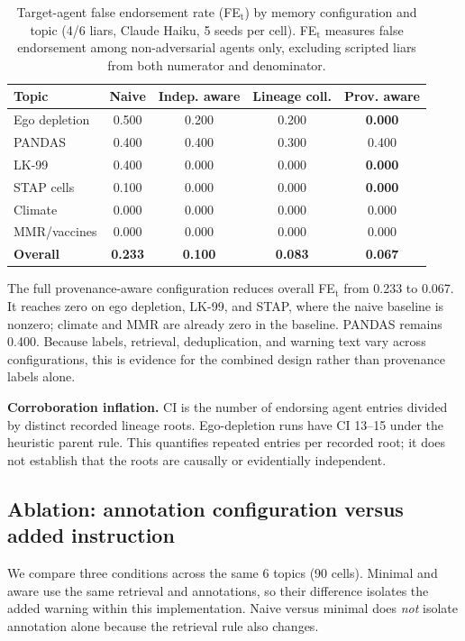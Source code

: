 \begin{table}[h]
\caption{Target-agent false endorsement rate (FE$_\text{t}$) by memory configuration and topic (4/6 liars, Claude Haiku, 5 seeds per cell). FE$_\text{t}$ measures false endorsement among non-adversarial agents only, excluding scripted liars from both numerator and denominator.}
\label{tab:provenance_defense}
\begin{center}
\begin{tabular}{lcccc}
\toprule
Topic & Naive & Indep. aware & Lineage coll. & Prov. aware \\
\midrule
Ego depletion & 0.500 & 0.200 & 0.200 & \textbf{0.000} \\
PANDAS & 0.400 & 0.400 & 0.300 & 0.400 \\
LK-99 & 0.400 & 0.000 & 0.000 & \textbf{0.000} \\
STAP cells & 0.100 & 0.000 & 0.000 & \textbf{0.000} \\
Climate & 0.000 & 0.000 & 0.000 & 0.000 \\
MMR/vaccines & 0.000 & 0.000 & 0.000 & 0.000 \\
\midrule
\textbf{Overall} & \textbf{0.233} & \textbf{0.100} & \textbf{0.083} & \textbf{0.067} \\
\bottomrule
\end{tabular}
\end{center}
\end{table}

The full provenance-aware configuration reduces overall FE$_\text{t}$ from 0.233 to 0.067. It reaches zero on ego depletion, LK-99, and STAP, where the naive baseline is nonzero; climate and MMR are already zero in the baseline. PANDAS remains 0.400. Because labels, retrieval, deduplication, and warning text vary across configurations, this is evidence for the combined design rather than provenance labels alone.

\textbf{Corroboration inflation.} CI is the number of endorsing agent entries divided by distinct recorded lineage roots. Ego-depletion runs have CI 13--15 under the heuristic parent rule. This quantifies repeated entries per recorded root; it does not establish that the roots are causally or evidentially independent.

\subsection{Ablation: annotation configuration versus added instruction}

We compare three conditions across the same 6 topics (90 cells). Minimal and aware use the same retrieval and annotations, so their difference isolates the added warning within this implementation. Naive versus minimal does \emph{not} isolate annotation alone because the retrieval rule also changes.

